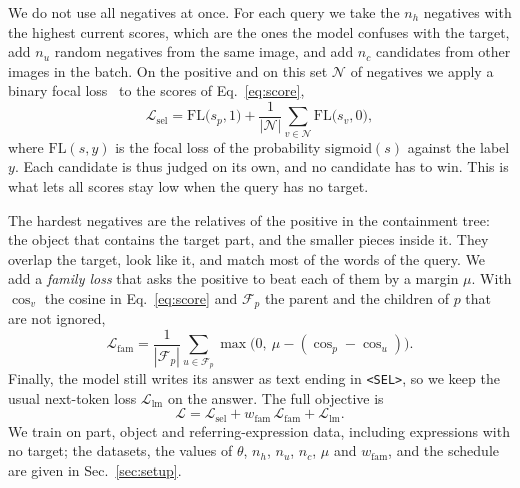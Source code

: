 We do not use all negatives at once. For each query we take the $n_h$ negatives with the highest current scores,
which are the ones the model confuses with the target, add $n_u$ random negatives from the same image, and add
$n_c$ candidates from other images in the batch. On the positive and on this set $\mathcal{N}$ of negatives we
apply a binary focal loss~\cite{focal} to the scores of Eq.~\eqref{eq:score},
\begin{equation}
  \mathcal{L}_{\mathrm{sel}}=\mathrm{FL}\big(s_p,1\big)+\frac{1}{|\mathcal{N}|}\sum_{v\in\mathcal{N}}\mathrm{FL}\big(s_v,0\big),
  \label{eq:lsel}
\end{equation}
where $\mathrm{FL}(s,y)$ is the focal loss of the probability $\mathrm{sigmoid}(s)$ against the label $y$. Each
candidate is thus judged on its own, and no candidate has to win. This is what lets all scores stay low when the
query has no target.

The hardest negatives are the relatives of the positive in the containment tree: the object that contains the
target part, and the smaller pieces inside it. They overlap the target, look like it, and match most of the words
of the query. We add a \emph{family loss} that asks the positive to beat each of them by a margin $\mu$. With
$\cos_v$ the cosine in Eq.~\eqref{eq:score} and $\mathcal{F}_p$ the parent and the children of $p$ that are not
ignored,
\begin{equation}
  \mathcal{L}_{\mathrm{fam}}=\frac{1}{|\mathcal{F}_p|}\sum_{u\in\mathcal{F}_p}\max\big(0,\ \mu-(\cos_p-\cos_u)\big).
  \label{eq:lfam}
\end{equation}
Finally, the model still writes its answer as text ending in \texttt{<SEL>}, so we keep the usual next-token loss
$\mathcal{L}_{\mathrm{lm}}$ on the answer. The full objective is
\begin{equation}
  \mathcal{L}=\mathcal{L}_{\mathrm{sel}}+w_{\mathrm{fam}}\,\mathcal{L}_{\mathrm{fam}}+\mathcal{L}_{\mathrm{lm}} .
  \label{eq:loss}
\end{equation}
We train on part, object and referring-expression data, including expressions with no target; the datasets, the
values of $\theta$, $n_h$, $n_u$, $n_c$, $\mu$ and $w_{\mathrm{fam}}$, and the schedule are given in
Sec.~\ref{sec:setup}.
